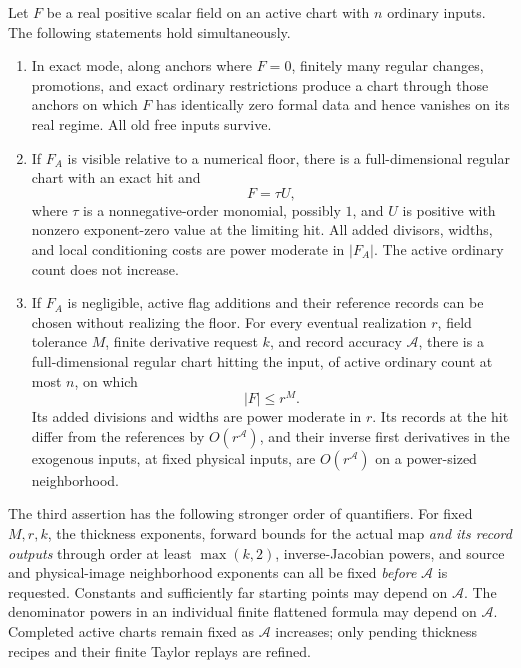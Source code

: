 \begin{proposition}
\label{prop:elimination-recursion}
Let $F$ be a real positive scalar field on an active chart with $n$
ordinary inputs.  The following statements hold simultaneously.
\begin{enumerate}
\item In exact mode, along anchors where $F=0$, finitely many regular
changes, promotions, and exact ordinary restrictions produce a chart
through those anchors on which $F$ has identically zero formal data
and hence vanishes on its real regime.  All old free inputs survive.
\item If $F_A$ is visible relative to a numerical floor, there is a
full-dimensional regular chart with an exact hit and
\begin{equation}\label{eq:elimination-visible}
 F=\tau U,
\end{equation}
where $\tau$ is a nonnegative-order monomial, possibly $1$, and $U$
is positive with nonzero exponent-zero value at the limiting hit.
All added divisors, widths, and local conditioning costs are power
moderate in $|F_A|$.  The active ordinary count does not increase.
\item If $F_A$ is negligible, active flag additions and their reference
records can be chosen without realizing the floor.  For every eventual
realization $r$, field tolerance $M$, finite derivative request $k$, and
record accuracy $\mathcal A$, there is a full-dimensional regular chart hitting
the input, of active ordinary count at most $n$, on which
\begin{equation}\label{eq:elimination-coarse}
 |F|\le r^M.
\end{equation}
Its added divisions and widths are power moderate in $r$.  Its records
at the hit differ from the references by $O(r^{\mathcal A})$, and their inverse
first derivatives in the exogenous inputs, at fixed physical inputs,
are $O(r^{\mathcal A})$ on a power-sized neighborhood.
\end{enumerate}
The third assertion has the following stronger order of quantifiers.
For fixed $M,r,k$, the thickness exponents, forward bounds for the
actual map \emph{and its record outputs} through order at least
$\max(k,2)$, inverse-Jacobian powers, and source and physical-image
neighborhood exponents can all be fixed \emph{before} $\mathcal A$ is requested.
Constants and sufficiently far starting points may depend on $\mathcal A$.
The denominator powers in an individual finite flattened formula may
depend on $\mathcal A$.  Completed active charts remain fixed as $\mathcal A$ increases;
only pending thickness recipes and their finite Taylor replays are
refined.


\end{proposition}

